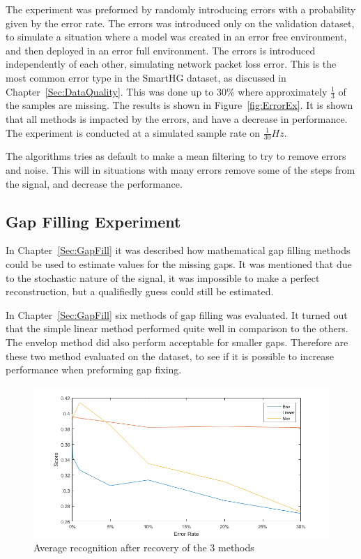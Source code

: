 The experiment was preformed by randomly introducing errors with a probability given by the error rate. The errors was introduced only on the validation dataset, to simulate a situation where a model was created in an error free environment, and then deployed in an error full environment. The errors is introduced independently of each other, simulating network packet loss error. This is the most common error type in the SmartHG dataset, as discussed in Chapter~\ref{Sec:DataQuality}.  This was done up to 30\% where approximately $\frac{1}{3}$ of the samples are missing. The results is shown in Figure~\ref{fig:ErrorEx}. It is shown that all methods is impacted by the errors, and have a decrease in performance. The experiment is conducted at a simulated sample rate on $\frac{1}{30} Hz$.

The algorithms tries as default to make a mean filtering to try to remove errors and noise. This will in situations with many errors remove some of the steps from the signal, and decrease the performance.  



\subsection{Gap Filling Experiment}
In Chapter~\ref{Sec:GapFill} it was described how mathematical gap filling methods could be used to estimate values for the missing gaps. It was mentioned that due to the stochastic nature of the signal, it was impossible to make a perfect reconstruction, but a qualifiedly guess could still be estimated.

In Chapter~\ref{Sec:GapFill} six methods of gap filling was evaluated. It turned out that the simple linear method performed quite well in comparison to the others. The envelop method did also perform acceptable for smaller gaps. Therefore are these two method evaluated on the  dataset, to see if it is possible to increase performance when preforming gap fixing. 


\begin{figure}[H]
\centering
\includegraphics[width=1\textwidth]{billeder/EcoRecError.png}
\caption{Average recognition after recovery of the 3 methods}
\label{fig:GER}
\end{figure}

